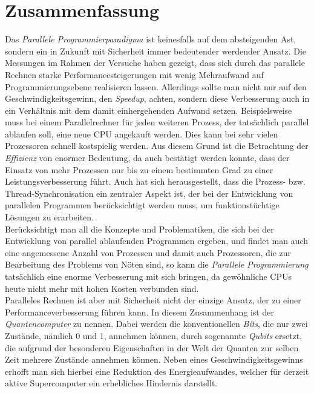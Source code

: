 
\chapter*{Zusammenfassung} %

	Das \textit{Parallele Programmierparadigma} ist keinesfalls auf dem absteigenden Ast, sondern ein in Zukunft mit Sicherheit immer bedeutender werdender Ansatz. Die Messungen im Rahmen der Versuche haben gezeigt, dass sich durch das parallele Rechnen starke Performancesteigerungen mit wenig Mehraufwand auf Programmierungsebene realisieren lassen. Allerdings sollte man nicht nur auf den Geschwindigkeitsgewinn, den \textit{Speedup}, achten, sondern diese Verbesserung auch in ein Verhältnis mit dem damit einhergehenden Aufwand setzen. Beispielsweise muss bei einem Parallelrechner für jeden weiteren Prozess, der tatsächlich parallel ablaufen soll, eine neue CPU angekauft werden. Dies kann bei sehr vielen Prozessoren schnell kostspielig werden. Aus diesem Grund ist die Betrachtung der \textit{Effizienz} von enormer Bedeutung, da auch bestätigt werden konnte, dass der Einsatz von mehr Prozessen nur bis zu einem bestimmten Grad zu einer Leistungsverbesserung führt. Auch hat sich herausgestellt, dass die Prozess- bzw. Thread-Synchronisation ein zentraler Aspekt ist, der bei der Entwicklung von parallelen Programmen berücksichtigt werden muss, um funktionstüchtige Lösungen zu erarbeiten.\\
	Berücksichtigt man all die Konzepte und Problematiken, die sich bei der Entwicklung von parallel ablaufenden Programmen ergeben, und findet man auch eine angemessene Anzahl von Prozessen und damit auch Prozessoren, die zur Bearbeitung des Problems von Nöten sind, so kann die \textit{Parallele Programmierung} tatsächlich eine enorme Verbesserung mit sich bringen, da gewöhnliche CPUs heute nicht mehr mit hohen Kosten verbunden sind.\\
	Paralleles Rechnen ist aber mit Sicherheit nicht der einzige Ansatz, der zu einer Performanceverbesserung führen kann. In diesem Zusammenhang ist der \textit{Quantencomputer} zu nennen. Dabei werden die konventionellen \textit{Bits}, die nur zwei Zustände, nämlich 0 und 1, annehmen können, durch sogenannte \textit{Qubits} ersetzt, die aufgrund der besonderen Eigenschaften in der Welt der Quanten zur selben Zeit mehrere Zustände annehmen können. Neben eines Geschwindigkeitsgewinns erhofft man sich hierbei eine Reduktion des Energieaufwandes, welcher für derzeit aktive Supercomputer ein erhebliches Hindernis darstellt. \cite{Quantencomputer}